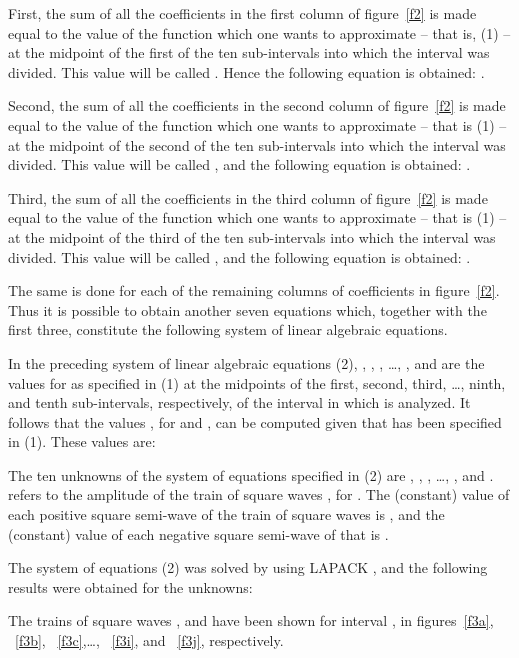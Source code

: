 \documentclass[11pt]{rMTA2010} \usepackage[utf8]{inputenc} \usepackage{graphicx} \usepackage{booktabs} \usepackage{array} \usepackage{enumerate}
\begin{document}
First, the sum of all the coefficients in the first column of figure~\ref{f2} is made equal to the value of the function which one wants to approximate -- that is, (1) -- at the midpoint of the first of the ten sub-intervals into which the interval  was divided. This value will be called . Hence the following equation is obtained:
.

Second, the sum of all the coefficients in the second column of figure~\ref{f2} is made equal to the value of the function which one wants to approximate -- that is (1) -- at the midpoint of the second of the ten sub-intervals into which the interval   was divided. This value will be called , and the following equation is obtained:
.

Third, the sum of all the coefficients in the third column of figure~\ref{f2} is made equal to the value of the function which one wants to approximate -- that is (1) -- at the midpoint of the third of the ten sub-intervals into which the interval  was divided. This value will be called , and the following equation is obtained:
.

The same is done for each of the remaining columns of coefficients in figure~\ref{f2}. Thus it is possible to obtain another seven equations which, together with the first three, constitute the following system of linear algebraic equations.



In the preceding system of linear algebraic equations (2), , , , \ldots, , and  are the values for  as specified in (1) at the midpoints of the first, second, third, \ldots, ninth, and tenth sub-intervals, respectively, of the interval  in which  is analyzed. It follows that the values , for  and , can be computed given that  has been specified in (1). These values are:


The ten unknowns of the system of equations specified in (2) are , , , \ldots, , and .  refers to the amplitude of the train of square waves , for . The (constant) value of each positive square semi-wave of the train of square waves  is , and the (constant) value of each negative square semi-wave of that  is .

The system of equations (2) was solved by using LAPACK \cite{b4}, and the following results were obtained for the unknowns:


The trains of square waves , and  have been shown for interval , in figures~\ref{f3a}, ~\ref{f3b}, ~\ref{f3c},\dots, ~\ref{f3i}, and ~\ref{f3j}, respectively.
\end{document}
